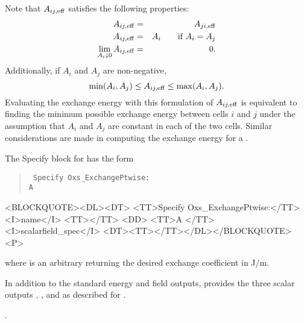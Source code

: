 \begin{description}
   Note that $A_{ij,{\rm eff}}$ satisfies
   the following properties:
   \begin{eqnarray*}
        A_{ij,{\rm eff}} & = & A_{ji,{\rm eff}} \\
        A_{ij,{\rm eff}} & = & A_i \qquad \mbox{if $A_i=A_j$} \\
        \lim_{A_i\downarrow 0} A_{ij,{\rm eff}} & = & 0.
   \end{eqnarray*}
   Additionally, if $A_i$ and $A_j$ are non-negative,
   \begin{displaymath}
        \min(A_i,A_j) \leq  A_{ij,{\rm eff}}  \leq \max(A_i,A_j).
   \end{displaymath}
   Evaluating the exchange energy with this formulation of $A_{ij,{\rm
   eff}}$ is equivalent to finding the minimum possible exchange energy
   between cells $i$ and $j$ under the assumption that $A_i$ and $A_j$
   are constant in each of the two cells.  Similar considerations are
   made in computing the exchange energy for a  \cite{porter2001}.

   The Specify block for  has the form
   \begin{latexonly}
      \begin{quote}\tt
      Specify Oxs\_ExchangePtwise: \ocb\\
        \bi A \\
      \ccb
      \end{quote}
   \end{latexonly}
   \begin{rawhtml}
   <BLOCKQUOTE><DL><DT>
   <TT>Specify Oxs_ExchangePtwise:</TT><I>name</I> <TT>{</TT>
       <DD> <TT>A </TT><I>scalarfield_spec</I>
   <DT><TT>}</TT></DL></BLOCKQUOTE><P>
   \end{rawhtml}
   where  is an arbitrary
    returning the desired exchange
   coefficient in J/m.

   In addition to the standard energy and field outputs,
    provides the three scalar outputs
   , , and
    as described for .

   \begin{ExampleMifs}[Example]
     .
   \end{ExampleMifs}


\end{description}
